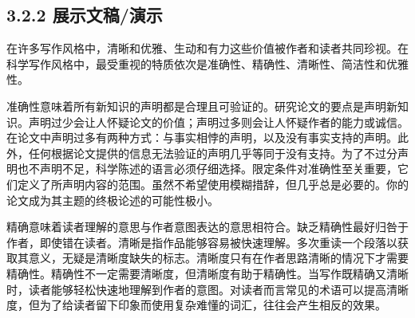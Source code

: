 \subsection*{3.2.2 展示文稿/演示}
在许多写作风格中，清晰和优雅、生动和有力这些价值被作者和读者共同珍视。在科学写作风格中，最受重视的特质依次是准确性、精确性、清晰性、简洁性和优雅性。

准确性意味着所有新知识的声明都是合理且可验证的。研究论文的要点是声明新知识。声明过少会让人怀疑论文的价值；声明过多则会让人怀疑作者的能力或诚信。在论文中声明过多有两种方式：与事实相悖的声明，以及没有事实支持的声明。此外，任何根据论文提供的信息无法验证的声明几乎等同于没有支持。为了不过分声明也不声明不足，科学陈述的语言必须仔细选择。限定条件对准确性至关重要，它们定义了所声明内容的范围。虽然不希望使用模糊措辞，但几乎总是必要的。你的论文成为其主题的终极论述的可能性极小。

精确意味着读者理解的意思与作者意图表达的意思相符合。缺乏精确性最好归咎于作者，即使错在读者。清晰是指作品能够容易被快速理解。多次重读一个段落以获取其意义，无疑是清晰度缺失的标志。清晰度只有在作者思路清晰的情况下才需要精确性。精确性不一定需要清晰度，但清晰度有助于精确性。当写作既精确又清晰时，读者能够轻松快速地理解到作者的意图。对读者而言常见的术语可以提高清晰度，但为了给读者留下印象而使用复杂难懂的词汇，往往会产生相反的效果。

